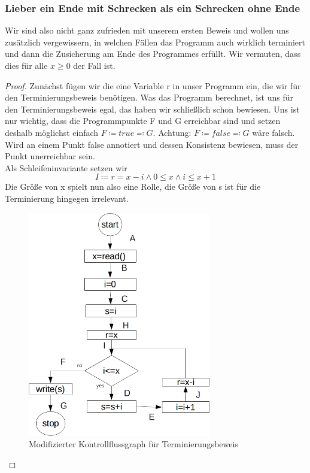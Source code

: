 \documentclass[hidelinks]{article}
\theoremstyle{plain}
\theoremstyle{definition}
\theoremstyle{rem}
\begin{document}
\begin{sloppypar}
\subsubsection{Lieber ein Ende mit Schrecken als ein Schrecken ohne Ende}
Wir sind also nicht ganz zufrieden mit unserem ersten Beweis und wollen uns zusätzlich vergewissern, in welchen Fällen das Programm auch wirklich terminiert und dann die Zusicherung am Ende des Programmes erfüllt. Wir vermuten, dass dies für alle $x\ge 0$ der Fall ist.\\
\begin{proof}
Zunächst fügen wir die eine Variable r in unser Programm ein, die wir für den Terminierungsbeweis benötigen. Was das Programm berechnet, ist uns für den Terminierungsbeweis egal, das haben wir schließlich schon bewiesen. Uns ist nur wichtig, dass die Programmpunkte F und G erreichbar sind und setzen deshalb möglichst einfach $F\coloneqq true\eqqcolon G$. Achtung: $F\coloneqq false\eqqcolon G$ wäre falsch. Wird an einem Punkt false annotiert und dessen Konsistenz bewiesen, muss der Punkt unerreichbar sein.\\
Als Schleifeninvariante setzen wir
\begin{equation*} 
I\coloneqq r=x-i\wedge 0\le x \wedge i\le x+1 
\end{equation*}
Die Größe von x spielt nun also eine Rolle, die Größe von s ist für die Terminierung hingegen irrelevant.
\begin{figure}[H]
	\includegraphics[width=8cm]{gauss_sum_termination.png}
	\centering
	\caption{Modifizierter Kontrollflussgraph für Terminierungsbeweis}
\end{figure}

\end{proof}
\end{sloppypar}
\end{document}
